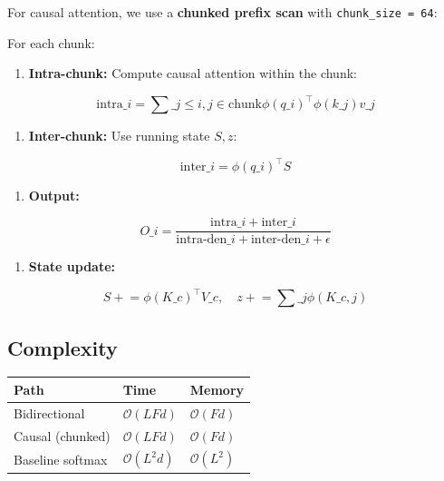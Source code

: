 For causal attention, we use a \textbf{chunked prefix scan} with \texttt{chunk\_size = 64}:

For each chunk:

\begin{enumerate}
\item \textbf{Intra-chunk:} Compute causal attention within the chunk:

\end{enumerate}
\[
\text{intra}\_i = \sum\_{j \leq i, j \in \text{chunk}} \phi(q\_i)^\top \phi(k\_j) v\_j
\tag{4.3}
\]

\begin{enumerate}
\item \textbf{Inter-chunk:} Use running state $S, z$:

\end{enumerate}
\[
\text{inter}\_i = \phi(q\_i)^\top S
\tag{4.4}
\]

\begin{enumerate}
\item \textbf{Output:}

\end{enumerate}
\[
O\_i = \frac{\text{intra}\_i + \text{inter}\_i}{\text{intra-den}\_i + \text{inter-den}\_i + \epsilon}
\tag{4.5}
\]

\begin{enumerate}
\item \textbf{State update:}

\end{enumerate}
\[
S \mathrel{+}= \phi(K\_c)^\top V\_c, \quad z \mathrel{+}= \sum\_j \phi(K\_{c,j})
\tag{4.6}
\]

\subsection{Complexity}

\begin{table}[H]
\centering
\small
\begin{tabular}{lll}
\toprule
\textbf{Path} & \textbf{Time} & \textbf{Memory} \\
\midrule
Bidirectional & $\mathcal{O}(L F d)$ & $\mathcal{O}(F d)$ \\
Causal (chunked) & $\mathcal{O}(L F d)$ & $\mathcal{O}(F d)$ \\
Baseline softmax & $\mathcal{O}(L^2 d)$ & $\mathcal{O}(L^2)$ \\
\bottomrule
\end{tabular}
\end{table}

